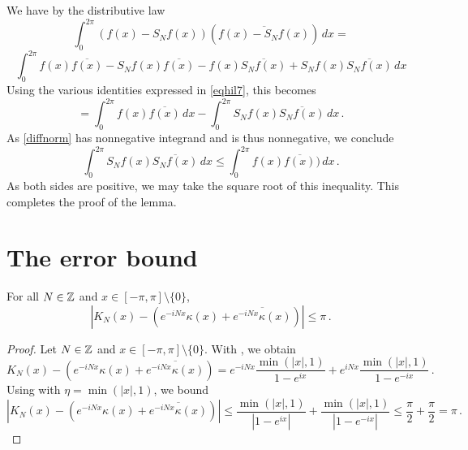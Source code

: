 We have by the distributive law
\begin{equation}\label{diffnorm}
    \int_0^{2\pi} (f(x)-S_Nf(x))(\overline{f(x)-S_Nf(x)})\, dx=
\end{equation}
\begin{equation*}
 \int_0^{2\pi} f(x)\overline{f(x)}
    -S_Nf(x)\overline{f(x)}
   -f(x)\overline{S_Nf(x)}
     + S_Nf(x)\overline{S_Nf(x)}\, dx
\end{equation*}
Using the various identities expressed in \eqref{eqhil7}, this becomes
\begin{equation}
 =\int_0^{2\pi} f(x)\overline{f(x)}\, dx
    -
   \int_0^{2\pi} S_Nf(x)\overline{S_Nf(x)}\, dx\, .
\end{equation}
As \eqref{diffnorm} has nonnegative integrand and is thus nonnegative, we conclude
\begin{equation}
  \int_0^{2\pi} S_Nf(x)\overline{S_Nf(x)}\, dx\le
 \int_0^{2\pi} f(x)\overline{f(x)})\, dx\, .
\end{equation}
As both sides are positive, we may take the square root of this inequality.
This completes the proof of the lemma.





\section{The error bound}
\label{10difference}

\begin{lemma}
    \label{Dirichlet-Hilbert}
    \leanok
    For all $N\in{\mathbb{Z}}$ and $x\in [-\pi,\pi] \setminus \{0\}$,
    \begin{equation*}
        \left|K_N(x) - (e^{-iNx}\kappa(x) + \overline{e^{-iNx}\kappa(x)})\right| \le \pi \,.
    \end{equation*}
\end{lemma}

\begin{proof}
    \leanok
    Let $N\in{\mathbb{Z}}$ and $x\in [-\pi,\pi] \setminus \{0\}$. With , we obtain
    \begin{equation*}
        K_N(x) - (e^{-iNx}\kappa(x) + \overline{e^{-iNx}\kappa(x)})
        = e^{-iNx} \frac{\min(|x|, 1) }{1 - e^{ix}} + e^{iNx} \frac{\min(|x|, 1) }{1 - e^{-ix}} \,.
    \end{equation*}
    Using  with $\eta = \min(|x|, 1)$, we bound
    \begin{equation*}
        \left|K_N(x) - (e^{-iNx}\kappa(x) + \overline{e^{-iNx}\kappa(x)})\right|
        \le \frac{\min(|x|, 1) }{|1 - e^{ix}|} + \frac{\min(|x|, 1)}{|1 - e^{-ix}|}
        \le \frac{\pi}{2} + \frac{\pi}{2} = \pi \,.
    \end{equation*}
\end{proof}

